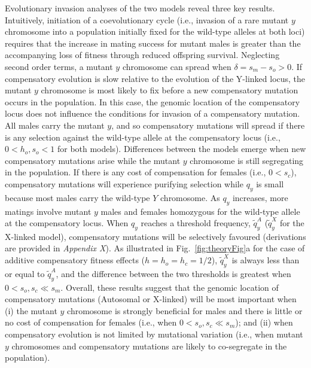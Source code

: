 \documentclass{article}
\begin{document}
Evolutionary invasion analyses of the two models reveal three key results. Intuitively, initiation of a coevolutionary cycle (i.e., invasion of a rare mutant $y$ chromosome into a population initially fixed for the wild-type alleles at both loci) requires that the increase in mating success for mutant males is greater than the accompanying loss of fitness through reduced offspring survival. Neglecting second order terms, a mutant $y$ chromosome can spread when $\delta = s_m - s_o > 0$. If compensatory evolution is slow relative to the evolution of the Y-linked locus, the mutant $y$ chromosome is most likely to fix before a new compensatory mutation occurs in the population. In this case, the genomic location of the compensatory locus does not influence the conditions for invasion of a compensatory mutation. All males carry the mutant $y$, and so compensatory mutations will spread if there is any selection against the wild-type allele at the compensatory locus (i.e., $0 < h_o,s_o < 1$ for both models). Differences between the models emerge when new compensatory mutations arise while the mutant $y$ chromosome is still segregating in the population. If there is any cost of compensation for females (i.e., $0 < s_c$), compensatory mutations will experience purifying selection while $q_y$ is small because most males carry the wild-type $Y$ chromosome. As $q_y$ increases, more matings involve mutant $y$ males and females homozygous for the wild-type allele at the compensatory locus. When $q_y$ reaches a threshold frequency, $\tilde{q}^{A}_{y}$ ($\tilde{q}^{X}_{y}$ for the X-linked model), compensatory mutations will be selectively favoured (derivations are provided in {\itshape Appendix X}). As illustrated in Fig.~\ref{fig:theoryFig}a for the case of additive compensatory fitness effects ($h = h_o = h_c = 1/2$), $\tilde{q}^{X}_{y}$ is always less than or equal to $\tilde{q}^{A}_{y}$, and the difference between the two thresholds is greatest when $0 < s_o,s_c \ll s_m$. Overall, these results suggest that the genomic location of compensatory mutations (Autosomal or X-linked) will be most important when (i) the mutant $y$ chromosome is strongly beneficial for males and there is little or no cost of compensation for females (i.e., when $0 < s_o,s_c \ll s_m$); and (ii) when compensatory evolution is not limited by mutational variation (i.e., when mutant $y$ chromosomes and compensatory mutations are likely to co-segregate in the population). 
\end{document}

